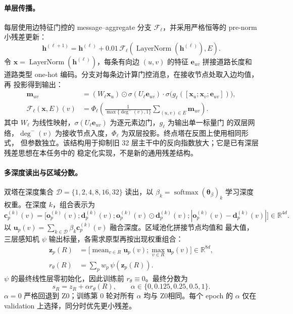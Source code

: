 \documentclass[UTF8,a4paper,10pt,twocolumn]{ctexart}
\newcommand{\zmethod}{Z0}
\begin{document}
\paragraph{单层传播。}
每层使用边特征门控的 message--aggregate 分支 $\mathcal{F}_\ell$，并采用严格恒等的 pre-norm
小残差更新：
\begin{equation}
  \bm{h}^{(\ell+1)}=\bm{h}^{(\ell)}+
  0.01\,\mathcal{F}_\ell\!\left(\operatorname{LayerNorm}(\bm{h}^{(\ell)}),E\right).
  \label{eq:g3}
\end{equation}
令 $\bm{x}=\operatorname{LayerNorm}(\bm{h}^{(\ell)})$，每条有向边 $(u,v)$ 的特征 $\bm e_{uv}$
拼接道路长度和道路类型 one-hot 编码。分支对每条边计算门控消息，在接收节点处取入边均值，再
投影得到输出：
\begin{equation}
  \begin{aligned}
  \bm{m}_{uv}&=(W_\ell\bm{x}_u)\odot\sigma(U_\ell\bm e_{uv})\cdot
  \sigma\!\bigl(g_\ell([\bm{x}_u;\bm{x}_v;\bm e_{uv}])\bigr),\\
  \mathcal F_\ell(\bm{x},E)(v)&=\Phi_\ell\!\left(
  \frac{1}{\max\{\deg^-(v),1\}}\sum_{(u,v)\in E}\bm m_{uv}\right).
  \end{aligned}
  \label{eq:fl}
\end{equation}
其中 $W_\ell$ 为线性映射，$\sigma(U_\ell\bm e_{uv})$ 为逐元素边门，$g_\ell$ 为输出单一标量门
的双层网络，$\deg^-(v)$ 为接收节点入度，$\Phi_\ell$ 为双层投影。终点塔在反图上使用相同形式，
但参数独立。该结构用于抑制旧 32 层主干中的反向指数放大；它是已有深层残差思想在本任务中的
稳定化实现，不是新的通用残差结构。

\paragraph{多深度读出与区域分数。}
双塔在深度集合 $\mathcal D=\{1,2,4,8,16,32\}$ 读出，以
$\beta_k=\operatorname{softmax}(\bm\theta_\beta)_k$ 学习深度权重。在深度 $k$，组合表示为
\begin{equation}
  \bm c_p^{(k)}(v)=\bigl[\bm o_p^{(k)}(v);\bm d_p^{(k)}(v);
  \bm o_p^{(k)}(v)\odot\bm d_p^{(k)}(v);
  |\bm o_p^{(k)}(v)-\bm d_p^{(k)}(v)|\bigr]\in\mathbb R^{4d}.
\end{equation}
以 $\bm u_p(v)=\sum_{k\in\mathcal D}\beta_k\bm c_p^{(k)}(v)$ 融合深度。区域池化拼接节点均值和
最大值，三层感知机 $\psi$ 输出标量，各需求原型再按出现权重组合：
\begin{equation}
  \begin{aligned}
  \bm z_p(R)&=\bigl[\operatorname{mean}_{v\in R}\bm u_p(v);
  \operatorname{max}_{v\in R}\bm u_p(v)\bigr]\in\mathbb R^{8d},\\
  r_\theta(R)&=\sum_p w_p\,\psi(\bm z_p(R)).
  \end{aligned}
  \label{eq:readout}
\end{equation}
$\psi$ 的最终线性层零初始化，因此训练前 $r_\theta\equiv0$。最终分数为
\begin{equation}
  s_R=z_R+\alpha r_\theta(R),\qquad
  \alpha\in\{0,0.125,0.25,0.5,1\}.
  \label{eq:g4score}
\end{equation}
$\alpha=0$ 严格回退到 \zmethod；训练第 0 轮对所有 $\alpha$ 均与 \zmethod 相同。每个 epoch 的
$\alpha$ 仅在 validation 上选择，同分时优先更小残差。
\end{document}
